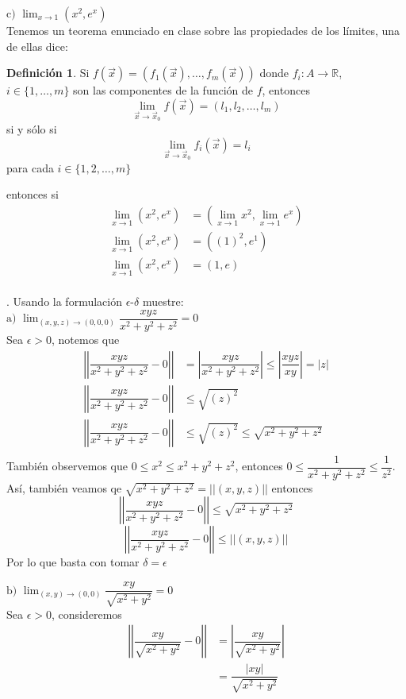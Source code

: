 \documentclass[letterpaper]{article}
\providecommand{\abs}[1]{\left|#1\right|}
\providecommand{\norm}[1]{\left|\left|#1\right|\right|}
\newcommand{\R}{\mathds{R}}
\renewcommand{\*}{\cdot}
\theoremstyle{definition}
\newtheorem{definition}{Definición}
\begin{document}
$\text{c) }\displaystyle\lim_{x \to 1} (x^2 , e^x) $\\[0.5cm]
Tenemos un teorema enunciado en clase sobre las propiedades de los límites, una de ellas dice:
\begin{definition}
	Si $ f(\vec{x}) = (f_1(\vec{x}), \dots, f_m(\vec{x})) $ donde $ f_i:A \to \R  $, $ i \in \{ 1, \dots, m \} $  son las componentes de la función de $ f $, entonces 
	\[ \lim\limits_{\vec{x} \to \vec{x}_0 } f(\vec{x}) = (l_1, l_2, \dots, l_m) \] si y sólo si\[ \lim\limits_{\vec{x} \to \vec{x}_0} f_i(\vec{x}) = l_i \] para cada $ i \in \{ 1, 2, \dots, m \} $
\end{definition}
entonces si
\begin{align*}
	\lim_{x \to 1} (x^2 , e^x) &=\left( \lim_{x \to 1} x^2, \lim_{x \to 1} e^x \right)\\
	\lim_{x \to 1} (x^2 , e^x) &=\left( (1)^2,  e^{1} \right)\\
	\lim_{x \to 1} (x^2 , e^x) &=\left( 1,  e \right)\\
\end{align*}

.  Usando la formulación $\epsilon$-$\delta$ muestre: \\

\noindent$ \text{a) } \displaystyle\lim_{(x,y,z) \to (0,0,0)} \dfrac{xyz}{x^2 + y^2 + z^2} = 0$\\

Sea $ \epsilon > 0 $, notemos que 
\begin{align*}
	\norm{\dfrac{xyz}{x^2 + y^2 + z^2} - 0} &= \abs{\dfrac{xyz}{x^2 + y^2 + z^2} } \leq \abs{ \dfrac{xyz}{xy}  }  = \abs{z}\\
	\norm{\dfrac{xyz}{x^2 + y^2 + z^2} - 0} & \leq \sqrt{(z)^2}\\
	\norm{\dfrac{xyz}{x^2 + y^2 + z^2} - 0} & \leq \sqrt{(z)^2}\leq \sqrt{x^2 + y^2 + z^2} \\
\end{align*}
También observemos que $ 0 \leq x^2 \leq x^2 + y^2 + z^2$, entonces $ 0 \leq \dfrac{1}{x^2 + y^2 + z^2} \leq \dfrac{1}{z^2} $.\\
Así, también veamos qe $ \sqrt{x^2 + y^2 + z^2}  = \norm{(x,y,z)} $ entonces
\[ \norm{\dfrac{xyz}{x^2 + y^2 + z^2} - 0} \leq \sqrt{x^2 + y^2 + z^2} \]
\[ \norm{\dfrac{xyz}{x^2 + y^2 + z^2} - 0} \leq \norm{(x,y,z)} \]
Por lo que basta con tomar $ \delta = \epsilon $

$\text{b) }\displaystyle\lim_{(x,y) \to (0,0)} \dfrac{xy }{\sqrt{x^2 + y^2}} = 0$\\
Sea $ \epsilon > 0 $, consideremos 
\begin{align*}
	\norm{\dfrac{xy}{\sqrt{x^2 + y^2}} - 0} &= \abs{\dfrac{xy}{\sqrt{x^2 + y^2}}}\\
	&= \dfrac{\abs{xy}}{\sqrt{x^2 + y^2}}\\
\end{align*}
\end{document}
